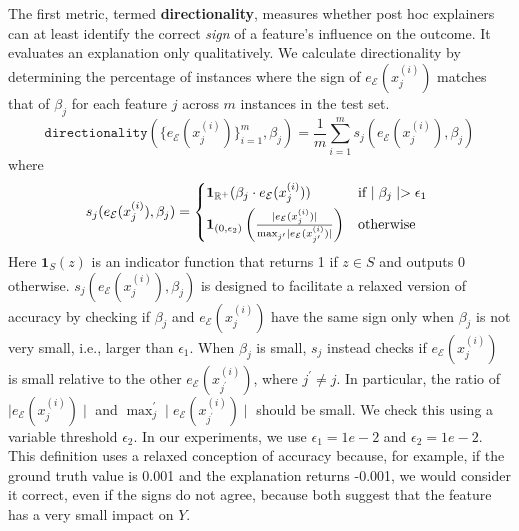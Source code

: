 \documentclass[12pt]{article}  %
\newcommand{\mE}{\mathcal{E}}
\begin{document}
    The first metric, termed \textbf{directionality}, measures whether post hoc explainers can at least identify the correct \textit{sign} of a feature's influence on the outcome. It evaluates an explanation only qualitatively. We calculate directionality by determining the percentage of instances where the sign of $e_\mE(x^{(i)}_j)$ matches that of $\beta_j$ for each feature $j$ across $m$ instances in the test set. %
    \begin{equation}
        \label{eq:acc}
        \texttt{directionality}(\{e_\mE(x^{(i)}_j)\}_{i=1}^m,\beta_j) = \frac{1}{m} \sum_{i=1}^m s_j( e_\mE(x^{(i)}_j),\beta_j)
    \end{equation}
    where 
    \begin{equation*}
        s_j(e_\mE(x^{(i)}_j),\beta_j) = \begin{cases*}
                    \mathbf{1}_{\mathbb{R}^+}(\beta_j \cdot e_\mE(x^{(i)}_j)) & if  $\mid \beta_j\mid > \epsilon_1$  \\
                     \mathbf{1}_{(0,\epsilon_2)}\left(\frac{\mid e_\mE(x^{(i)}_j)\mid }{\max_{j'} \mid e_\mE(x^{(i)}_{j'})\mid}\right) & otherwise
                 \end{cases*}
    \end{equation*}
    Here $\mathbf{1}_S(z)$ is an indicator function that returns 1 if $z\in S$ and outputs 0 otherwise. $s_j(e_\mE(x^{(i)}_j),\beta_j)$ is designed to facilitate a relaxed version of accuracy by checking if $\beta_j$ and $e_\mE(x^{(i)}_j)$ have the same sign only when $\beta_j$ is not very small, i.e., larger than $\epsilon_1$. When $\beta_j$ is small, $s_j$ instead checks if $e_\mE(x^{(i)}_j)$ is small relative to the other $e_\mE(x^{(i)}_{j^{\prime}})$, where $j^\prime \neq j$. In particular, the ratio of $\mid e_\mE(x^{(i)}_j)\mid $ and $\max_j^\prime \mid e_\mE(x^{(i)}_{j^\prime})\mid$ should be small. We check this using a variable threshold $\epsilon_2$. In our experiments, we use $\epsilon_1=1e-2$ and $\epsilon_2=1e-2$. This definition uses a relaxed conception of accuracy because, for example, if the ground truth value is 0.001 and the explanation returns -0.001, we would consider it correct, even if the signs do not agree, because both suggest that the feature has a very small impact on $Y$.
    
\end{document}
